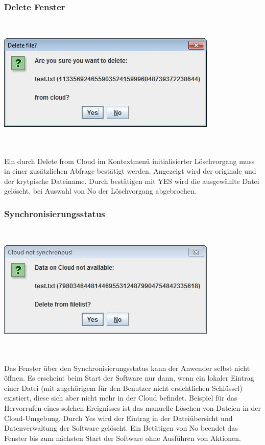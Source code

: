 \documentclass[13pt,a4paper,bibliography=totocnumbered,listof=totocnumbered]{scrartcl}
\begin{document}
\subsubsection{Delete Fenster}
$\;$\\
\begin{minipage}{\linewidth}
	\centering
	\includegraphics[width=0.4\linewidth]{./img/Delete.jpg}
	\label{Delete}
\end{minipage}
\\\\Ein durch Delete from Cloud im Kontextmenü initialisierter Löschvorgang muss in einer zusätzlichen Abfrage bestätigt werden. Angezeigt wird der originale und der krytpische Dateiname. Durch bestätigen mit YES wird die ausgewählte Datei gelöscht, bei Auswahl von No der Löschvorgang abgebrochen.

\subsubsection{Synchronisierungsstatus}
$\;$\\
\begin{minipage}{\linewidth}
	\centering
	\includegraphics[width=0.4\linewidth]{./img/Synchron.jpg}
	\label{Synchron}
\end{minipage}
\\\\Das Fenster über den Synchronisierungsstatus kann der Anwender selbst nicht öffnen. Es erscheint beim Start der Software nur dann, wenn ein lokaler Eintrag einer Datei (mit zugehörigem für den Benutzer nicht ersichtlichen Schlüssel) existiert, diese sich aber nicht mehr in der Cloud befindet. Beispiel für das Hervorrufen eines solchen Ereignisses ist das manuelle Löschen von Dateien in der Cloud-Umgebung. Durch Yes wird der Eintrag in der Dateiübersicht und Datenverwaltung der Software gelöscht. Ein Betätigen von No beendet das Fenster bis zum nächsten Start der Software ohne Ausführen von Aktionen.
\pagebreak
\end{document}

